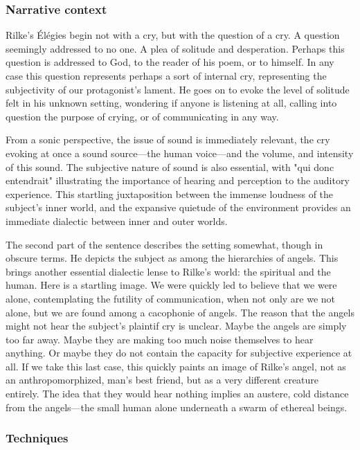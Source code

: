 \documentclass[12pt,twoside,maitrise]{dms}
\theoremstyle{definition}
\begin{document}
\subsubsection{Narrative context}
Rilke's Élégies begin not with a cry, but with the question of a cry.
A question seemingly addressed to no one.
A plea of solitude and desperation.
Perhaps this question is addressed to God, to the reader of his poem, or to himself.
In any case this question represents perhaps a sort of internal cry, representing the subjectivity of our protagonist's lament.
He goes on to evoke the level of solitude felt in his unknown setting, wondering if anyone is listening at all, calling into question the purpose of crying, or of communicating in any way.

From a sonic perspective, the issue of sound is immediately relevant, the cry evoking at once a sound source---the human voice---and the volume, and intensity of this sound.
The subjective nature of sound is also essential, with "qui donc entendrait" illustrating the importance of hearing and perception to the auditory experience.
This startling juxtaposition between the immense loudness of the subject's inner world, and the expansive quietude of the environment provides an immediate dialectic between inner and outer worlds.

The second part of the sentence describes the setting somewhat, though in obscure terms.
He depicts the subject as among the hierarchies of angels.
This brings another essential dialectic lense to Rilke's world: the spiritual and the human.
Here is a startling image.
We were quickly led to believe that we were alone, contemplating the futility of communication, when not only are we not alone, but we are found among a cacophonie of angels.
The reason that the angels might not hear the subject's plaintif cry is unclear. 
Maybe the angels are simply too far away.
Maybe they are making too much noise themselves to hear anything.
Or maybe they do not contain the capacity for subjective experience at all.
If we take this last case, this quickly paints an image of Rilke's angel, not as an anthropomorphized, man's best friend, but as a very different creature entirely.
The idea that they would hear nothing implies an austere, cold distance from the angels---the small human alone underneath a swarm of ethereal beings.

\subsubsection{Techniques}
\end{document}
